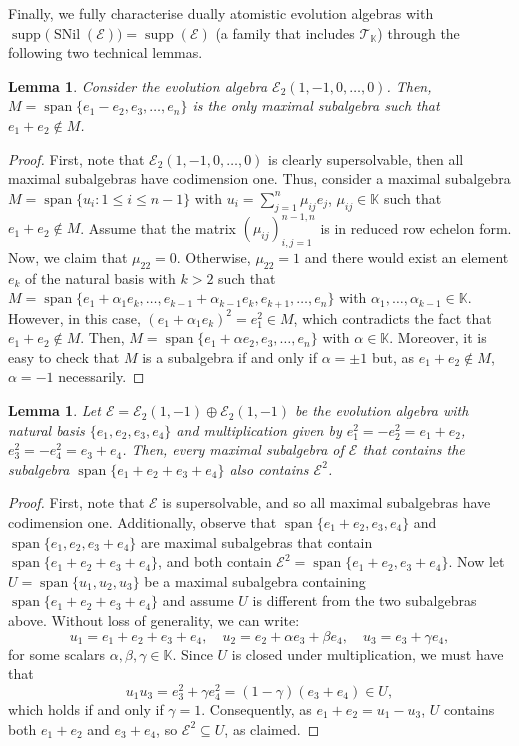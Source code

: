\documentclass[12pt,reqno]{amsart}
\newtheorem{lemma}[theorem]{Lemma}
\theoremstyle{definition}
\theoremstyle{remark}
\DeclareMathOperator{\spa}{span}
\DeclareMathOperator{\supp}{supp}
\DeclareMathOperator{\snil}{SNil}
\numberwithin{equation}{section}
\begin{document}
Finally, we fully characterise dually atomistic evolution algebras with $\supp\big(\snil(\mathcal{E})\big)=\supp(\mathcal{E})$ (a family that includes $\mathcal{T}_\mathbb{K}$) through the following two technical lemmas.

\begin{lemma}\label{lem:max_sub}
	Consider the evolution algebra $\mathcal{E}_2(1,-1,0,\dots,0)$. Then, $M=\spa\{e_1-e_2,e_3,\dots,e_n\}$ is the only maximal subalgebra such that $e_1+e_2\notin M$. 
\end{lemma}
\begin{proof}
First, note that $\mathcal{E}_2(1,-1,0,\dots,0)$ is clearly supersolvable, then all maximal subalgebras have codimension one. Thus, consider a maximal subalgebra $M=\spa\{u_i\colon 1\leq i\leq n-1\}$ with $u_i=\sum_{j=1}^{n}\mu_{ij}e_j$, $\mu_{ij}\in\mathbb{K}$ such that $e_1+e_2\notin M$. Assume that the matrix $(\mu_{ij})_{i,j=1}^{n-1,n}$ is in reduced row echelon form. Now, we claim that $\mu_{22}=0$. Otherwise, $\mu_{22}=1$ and there would exist an element $e_k$ of the natural basis with $k>2$ such that $M=\spa\{e_1+\alpha_1e_k,\dots,e_{k-1}+\alpha_{k-1}e_k,e_{k+1},\dots,e_n\}$ with $\alpha_1,\dots,\alpha_{k-1}\in\mathbb{K}$. However, in this case, $(e_1+\alpha_1e_k )^2=e_1^2\in M$, which contradicts the fact that $e_1+e_2\notin M$. Then, $M=\spa\{e_1+\alpha e_2,e_3,\dots,e_n\}$ with $\alpha\in\mathbb{K}$. Moreover, it is easy to check that $M$ is a subalgebra if and only if $\alpha=\pm1$ but, as $e_1+e_2\notin M$, $\alpha=-1$ necessarily.
\end{proof}
\begin{lemma}\label{lem:special_case}
Let $\mathcal{E} = \mathcal{E}_2(1,-1) \oplus \mathcal{E}_2(1,-1)$ be the evolution algebra with natural basis $\{e_1,e_2,e_3,e_4\}$ and multiplication given by $e_1^2 = -e_2^2 = e_1 + e_2$, $e_3^2 = -e_4^2 = e_3 + e_4$. Then, every maximal subalgebra of $\mathcal{E}$ that contains the subalgebra $\spa\{e_1 + e_2 + e_3 + e_4\}$ also contains $\mathcal{E}^2$.
\end{lemma}
\begin{proof}
First, note that $\mathcal{E}$ is supersolvable, and so all maximal subalgebras have codimension one. Additionally, observe that $\spa\{e_1+e_2,e_3,e_4\}$ and $\spa\{e_1,e_2,e_3+e_4\}$ are maximal subalgebras that contain $\spa\{e_1 + e_2 + e_3 + e_4\}$, and both contain $\mathcal{E}^2 = \spa\{e_1 + e_2,e_3 + e_4\}$.
Now let $U = \spa\{u_1,u_2,u_3\}$ be a maximal subalgebra containing $\spa\{e_1 + e_2 + e_3 + e_4\}$ and assume $U$ is different from the two subalgebras above. Without loss of generality, we can write:
\[
u_1 = e_1 + e_2 + e_3 + e_4, \quad
u_2 = e_2 + \alpha e_3 + \beta e_4, \quad
u_3 = e_3 + \gamma e_4,
\]
for some scalars $\alpha, \beta, \gamma \in \mathbb{K}$.
Since $U$ is closed under multiplication, we must have that
\[
u_1 u_3 = e_3^2 + \gamma e_4^2 = (1 - \gamma)(e_3 + e_4) \in U,
\]
which holds if and only if $\gamma = 1$. Consequently, as $e_1 + e_2 = u_1 - u_3$,  $U$ contains both $e_1 + e_2$ and $e_3 + e_4$, so $\mathcal{E}^2 \subseteq U$, as claimed.
\end{proof}
\end{document}
